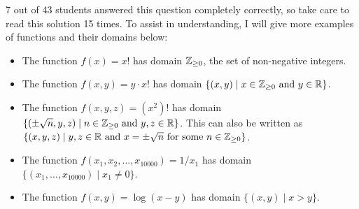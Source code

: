 \documentclass[11pt,oneside]{amsart}
\theoremstyle{definition}
\begin{document}
\begin{problem}
\begin{enumerate}[(b)]
\begin{solution}
      7 out of 43 students answered this question completely correctly, so take care to read this solution 15 times. To assist in understanding, I will give more examples of functions and their domains below:
      \begin{itemize}
        \item The function $f(x)=x!$ has domain $\mathbb Z_{\geq 0}$, the set of non-negative integers.
        \item The function $f(x,y)=y\cdot x!$ has domain $\{(x,y)\mid x\in\mathbb Z_{\geq 0}\text{ and }y\in\mathbb R\}$.
        \item The function $f(x,y,z)=(x^2)!$ has domain $\{(\pm\sqrt n,y,z)\mid n\in\mathbb Z_{\geq 0}\text{ and }y,z\in\mathbb R\}$. This can also be written as $\{(x,y,z)\mid y,z\in\mathbb R\text{ and }x=\pm\sqrt n\text{ for some }n\in\mathbb Z_{\geq 0}\}$.
        \item The function $f(x_1,x_2,\dots,x_{10000})=1/x_1$ has domain $\{(x_1,\dots,x_{10000})\mid x_1\neq 0\}$.
        \item The function $f(x,y)=\log(x-y)$ has domain $\{(x,y)\mid x>y\}$.
      \end{itemize}
    \end{solution}
  
  \end{enumerate}
\end{problem}
\end{document}
